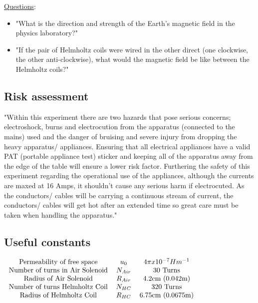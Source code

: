 \documentclass[12pt]{article}
\begin{document}
\underline{Questions}:
\begin{itemize}
    \item "What is the direction and strength of the Earth's magnetic field in the physics laboratory?" \cite{Exp.5-2019}
    \item "If the pair of Helmholtz coils were wired in the other direct (one clockwise, the other anti-clockwise), what would the magnetic field be like between the Helmholtz coils?" \cite{Exp.5-2019}
\end{itemize}

\subsection{Risk assessment}

"Within this experiment there are two hazards that pose serious concerns; electroshock, burns and electrocution from the apparatus (connected to the mains) used and the danger of bruising and severe injury from dropping the heavy apparatus/ appliances. Ensuring that all electrical appliances have a valid PAT (portable appliance test) sticker and keeping all of the apparatus away from the edge of the table will ensure a lower risk factor. Furthering the safety of this experiment regarding the operational use of the appliances, although the currents are maxed at 16 Amps, it shouldn't cause any serious harm if electrocuted. As the conductors/ cables will be carrying a continuous stream of current, the conductors/ cables will get hot after an extended time so great care must be taken when handling the apparatus." \cite{Exp.5-2019}\cite{Exp.5-Risk}\cite{Exp.5-Lab_book}

\subsection{Useful constants}
\label{constants}

\begin{table}[H]
\begin{center}
 \begin{math}
 \begin{tabular}{c c c}
 Permeability of free space & $u_0$ & $4\pi x10^{-7}Hm^{-1}$ \\
 Number of turns in Air Solenoid & $N_{Air}$ & 30 Turns \\
 Radius of Air Solenoid & $R_{Air}$ & 4.2cm (0.042m) \\
 Number of turns Helmholtz Coil & $N_{HC}$ & 320 Turns \\
 Radius of Helmholtz Coil & $R_{HC}$ & 6.75cm (0.0675m) \\
 \end{tabular}
 \end{math}
 \caption{Useful Constants \cite{Exp.5-2019}}
 \label{Useful Constants}
\end{center}
\end{table}
\end{document}
